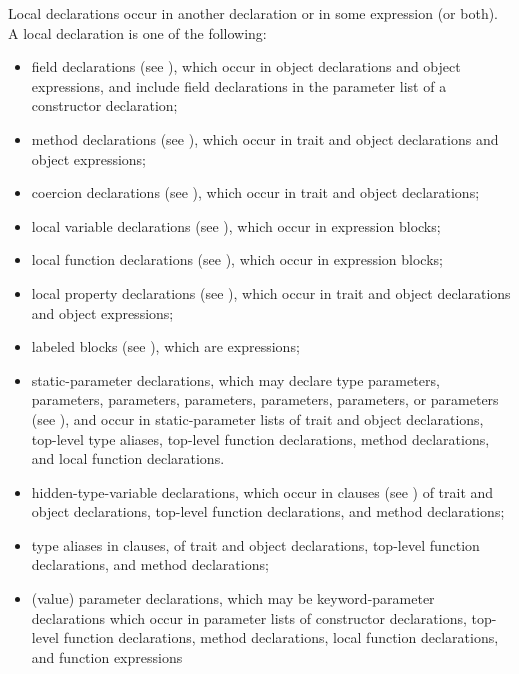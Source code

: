 Local declarations occur in another declaration
or in some expression (or both).
A local declaration is one of the following:
\begin{itemize}

\item
field declarations (see ),
which occur in object declarations and object expressions,
and include field declarations
in the parameter list of a constructor declaration;

\item
method declarations (see ),
which occur in trait and object declarations
and object expressions;

\item
coercion declarations (see ),
which occur in trait and object declarations;

\item
local variable declarations (see ),
which occur in expression blocks;

\item
local function declarations (see ),
which occur in expression blocks;

\item
local property declarations (see ),
which occur in trait and object declarations and object expressions;

\item
labeled blocks (see ),
which are expressions;

\item
static-parameter declarations,
which may declare
type parameters,
 parameters,
 parameters,
 parameters,
 parameters,
 parameters,
or  parameters
(see ),
and occur in static-parameter lists
of trait and object declarations,
top-level type aliases,
top-level function declarations,
method declarations,
and local function declarations.

\item
hidden-type-variable declarations,
which occur in  clauses
(see )
of trait and object declarations,
top-level function declarations,
and method declarations;

\item
type aliases in  clauses,
of trait and object declarations,
top-level function declarations,
and method declarations;

\item
(value) parameter declarations,
which may be keyword-parameter declarations
which occur in parameter lists
of constructor declarations,
top-level function declarations,
method declarations,
local function declarations,
and function expressions

\end{itemize}

